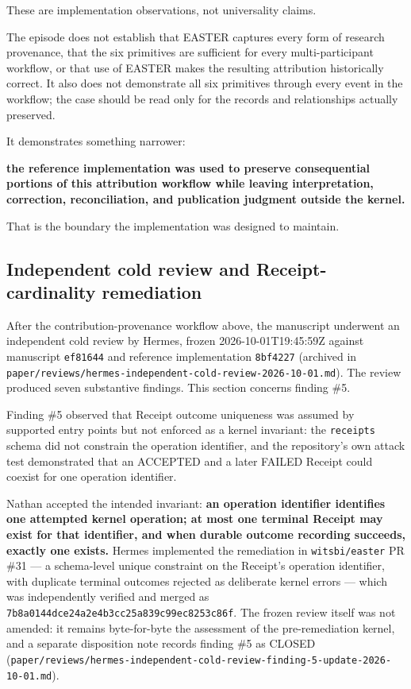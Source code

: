 \documentclass[11pt]{article}
\begin{document}
These are implementation observations, not universality claims.

The episode does not establish that EASTER captures every form of research provenance, that the six primitives are sufficient for every multi-participant workflow, or that use of EASTER makes the resulting attribution historically correct. It also does not demonstrate all six primitives through every event in the workflow; the case should be read only for the records and relationships actually preserved.

It demonstrates something narrower:

\textbf{the reference implementation was used to preserve consequential portions of this attribution workflow while leaving interpretation, correction, reconciliation, and publication judgment outside the kernel.}

That is the boundary the implementation was designed to maintain.

\subsection{Independent cold review and Receipt-cardinality remediation}

After the contribution-provenance workflow above, the manuscript underwent an independent cold review by Hermes, frozen 2026-10-01T19:45:59Z against manuscript \texttt{ef81644} and reference implementation \texttt{8bf4227} (archived in \texttt{paper/reviews/hermes-independent-cold-review-2026-10-01.md}). The review produced seven substantive findings. This section concerns finding \#5.

Finding \#5 observed that Receipt outcome uniqueness was assumed by supported entry points but not enforced as a kernel invariant: the \texttt{receipts} schema did not constrain the operation identifier, and the repository's own attack test demonstrated that an ACCEPTED and a later FAILED Receipt could coexist for one operation identifier.

Nathan accepted the intended invariant: \textbf{an operation identifier identifies one attempted kernel operation; at most one terminal Receipt may exist for that identifier, and when durable outcome recording succeeds, exactly one exists.} Hermes implemented the remediation in \texttt{witsbi/easter} PR \#31 --- a schema-level unique constraint on the Receipt's operation identifier, with duplicate terminal outcomes rejected as deliberate kernel errors --- which was independently verified and merged as \texttt{7b8a0144dce24a2e4b3cc25a839c99ec8253c86f}. The frozen review itself was not amended: it remains byte-for-byte the assessment of the pre-remediation kernel, and a separate disposition note records finding \#5 as CLOSED (\texttt{paper/reviews/hermes-independent-cold-review-finding-5-update-2026-10-01.md}).
\end{document}
